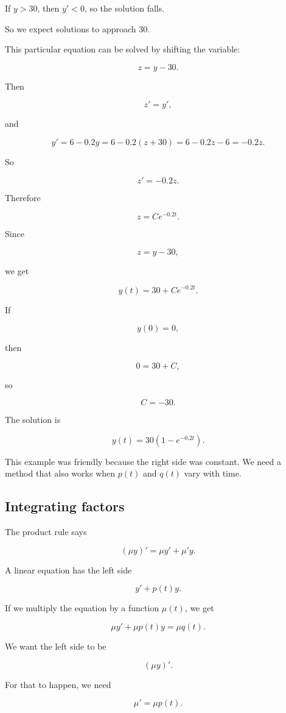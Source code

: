 If \(y>30\), then \(y'<0\), so the solution falls.

So we expect solutions to approach \(30\).

This particular equation can be solved by shifting the variable:

\[
z=y-30.
\]

Then

\[
z'=y',
\]

and

\[
y'=6-0.2y
=
6-0.2(z+30)
=
6-0.2z-6
=
-0.2z.
\]

So

\[
z'=-0.2z.
\]

Therefore

\[
z=Ce^{-0.2t}.
\]

Since

\[
z=y-30,
\]

we get

\[
\boxed{
y(t)=30+Ce^{-0.2t}.
}
\]

If

\[
y(0)=0,
\]

then

\[
0=30+C,
\]

so

\[
C=-30.
\]

The solution is

\[
\boxed{
y(t)=30\left(1-e^{-0.2t}\right).
}
\]

This example was friendly because the right side was constant.  We need a method that
also works when \(p(t)\) and \(q(t)\) vary with time.

\subsection{Integrating factors}
\label{subsec:integrating-factors}

The product rule says

\[
(\mu y)'=\mu y'+\mu' y.
\]

A linear equation has the left side

\[
y'+p(t)y.
\]

If we multiply the equation by a function \(\mu(t)\), we get

\[
\mu y'+\mu p(t)y=\mu q(t).
\]

We want the left side to be

\[
(\mu y)'.
\]

For that to happen, we need

\[
\mu'=\mu p(t).
\]

